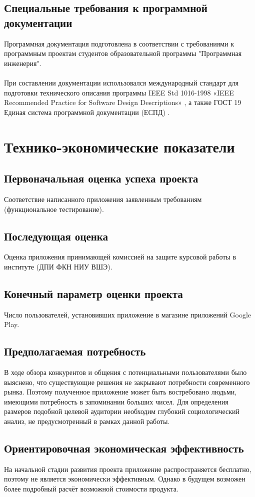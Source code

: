 \documentclass[draft]{article}
\begin{document}
\subsection{Специальные требования к программной документации}
Программная документация подготовлена в соответствии с требованиями к программным проектам студентов образовательной программы "{}Программная инженерия"{}.\\
~\\
При составлении документации использовался международный стандарт для подготовки технического описания программы IEEE Std 1016-1998 «IEEE Recommended Practice for Software Design Descriptions» \cite{litlink12}, а также ГОСТ 19 Единая система программной документации (ЕСПД) \cite{litlink13}.
\newpage
\section {Технико-экономические показатели}
\subsection{Первоначальная оценка успеха проекта}
Соответствие написанного приложения заявленным требованиям (функциональное тестирование).
\subsection{Последующая оценка}
Оценка приложения принимающей комиссией на защите курсовой работы в институте (ДПИ ФКН НИУ ВШЭ).
\subsection{Конечный параметр оценки проекта}
Число пользователей, установивших приложение в магазине приложений Google Play.\\
\subsection{Предполагаемая потребность}
В ходе обзора конкурентов и общения с потенциальными пользователями было выяснено, что существующие решения не закрывают потребности современного рынка. Поэтому полученное приложение может быть востребовано людьми, имеющими потребность в запоминании больших чисел. Для определения размеров подобной целевой аудитории необходим глубокий социологический анализ, не предусмотренный в рамках данной работы.
\subsection{Ориентировочная экономическая эффективность}
На начальной стадии развития проекта приложение распространяется бесплатно, поэтому не является экономически эффективным. Однако в будущем возможен более подробный расчёт возможной стоимости продукта.
\end{document}

